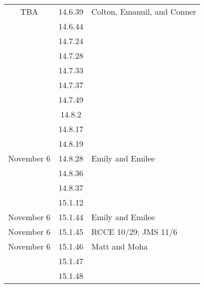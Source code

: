 \documentclass[12pt]{amsart}
\begin{document}
\begin{longtable}{c|c|l}
        TBA             & 14.6.39                              & Colton, Emanuil, and Conner              \\
                        & 14.6.44                              &                                          \\
                        & 14.7.24                              &                                          \\
                        & 14.7.28                              &                         \\
                        & 14.7.33                              &                                          \\
                        & 14.7.37                              &                                          \\
                        & 14.7.49                              &                                          \\
                        & 14.8.2                               &                                          \\
                        & 14.8.17                              &                                          \\
                        & 14.8.19                              &                                          \\
        November 6      & 14.8.28                              & Emily and Emilee                                          \\
                        & 14.8.36                              &                                          \\
                        & 14.8.37                              &                                          \\
                        & 15.1.12                              &                                             \\
        November 6      & 15.1.44                              & Emily and Emilee                         \\
        November 6      & 15.1.45                              & RCCE 10/29; JMS 11/6                                         \\
        November 6      & 15.1.46                              & Matt and Moha                         \\
                        & 15.1.47                              &                                          \\
                        & 15.1.48                              &                                          
    \end{longtable}
\end{document}
